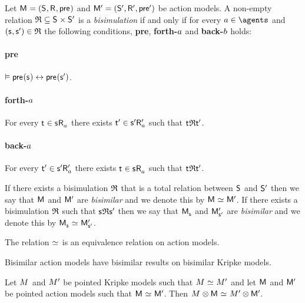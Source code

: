 \begin{definition}
Let $\aModelAndTuple$ and $\aModelAndTupleP$ be action models.
A non-empty relation $\bisimulation \subseteq \aStates \times \aStatesP$ is a {\em bisimulation} if and only if for every $\agentA \in \agents$ and $(\aStateS, \aStateSP) \in \bisimulation$ the following conditions, {\bf pre}, {\bf forth-$a$} and {\bf back-$b$} holds:

\paragraph{pre}
$\entails \aPrecondition(\aStateS) \iff \aPrecondition(\aStateSP)$.

\paragraph{forth-$a$}
For every $\aStateT \in \aSuccessorsA{\aStateS}$ there exists ${\mathsf{{t}}^{\prime}} \in {{\mathsf{{s}}^{\prime}}} {\mathsf{R}^{\prime}_{a}}$ such that $\aStateT \bisimulation \aStateTP$.

\paragraph{back-$a$}
For every ${\mathsf{{t}}^{\prime}} \in {{\mathsf{{s}}^{\prime}}} {\mathsf{R}^{\prime}_{a}}$ there exists $\aStateT \in \aSuccessorsA{\aStateS}$ such that $\aStateT \bisimulation \aStateTP$.

If there exists a bisimulation $\mathfrak{R}$ that is a total relation between $\aStates$ and ${\mathsf{S}^{\prime}}$ then we say that $\aModel$ and ${\mathsf{M}^{\prime}}$ are {\em bisimilar} and we denote this by $\aModel \bisimilar \aModelP$.
If there exists a bisimulation $\mathfrak{R}$ such that $\aStateS \bisimulation \aStateSP$ then we say that $\aPModel{\aStateS}$ and ${\mathsf{M}^{\prime}_{{\mathsf{{s}}^{\prime}}}}$ are {\em bisimilar} and we denote this by $\aPModel{\aStateS} \bisimilar \aPModelP{\aStateSP}$.
\end{definition}

\begin{proposition}
The relation $\bisimilar$ is an equivalence relation on action models.
\end{proposition}

Bisimilar action models have bisimilar results on bisimilar Kripke models.

\begin{proposition}\label{action-bisimulation-results}
Let $\kModel$ and ${M^{\prime}_{}}$ be pointed Kripke models such that $\kModel \bisimilar \kModelP$ and
let $\aModel$ and ${\mathsf{M}^{\prime}}$ be pointed action models such that $\aModel \bisimilar \aModelP$.
Then $\kModel \exec \aModel \bisimilar \kModelP \exec \aModelP$.
\end{proposition}

